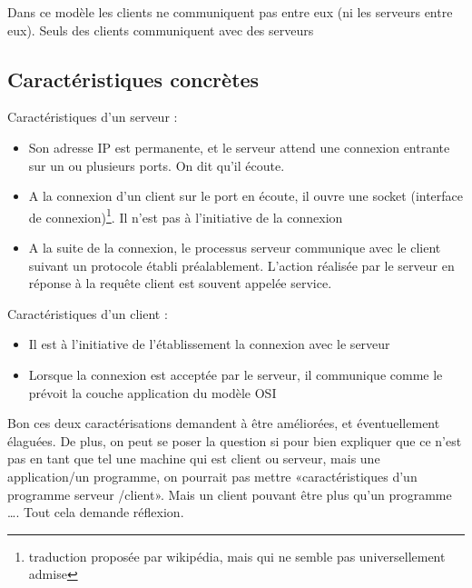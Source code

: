 \begin{rem}
	Dans ce modèle les clients ne communiquent pas entre eux (ni les serveurs entre eux). Seuls des clients communiquent avec des serveurs
\end{rem}

\subsection{Caractéristiques concrètes}

\begin{principe}
	Caractéristiques d'un serveur : \begin{itemize}[label=$\star$]
		\item Son adresse IP est permanente, et le serveur attend une connexion entrante sur un ou plusieurs ports. On dit qu'il écoute.
		\item A la connexion d'un client sur le port en écoute, il ouvre une socket (interface de connexion)\footnote{traduction proposée par wikipédia, mais qui ne semble pas universellement admise}. Il n'est pas à l'initiative de la connexion
		\item A la suite de la connexion, le processus serveur communique avec le client suivant un protocole établi préalablement. L'action réalisée par le serveur en réponse à la requête client est souvent appelée service.
	\end{itemize}
\end{principe}

\begin{principe}
	Caractéristiques d'un client : \begin{itemize}
		\item Il est à l'initiative de l'établissement la connexion avec le serveur
		\item Lorsque la connexion est acceptée par le serveur, il communique comme le prévoit la couche application du modèle OSI
	\end{itemize}
\end{principe}

\begin{com}
	Bon ces deux caractérisations demandent à être améliorées, et éventuellement élaguées. De plus, on peut se poser la question si pour bien expliquer que ce n'est pas en tant que tel une machine qui est client ou serveur, mais une application/un programme, on pourrait pas mettre «caractéristiques d'un programme serveur /client». Mais un client pouvant être plus qu'un programme \dots. Tout cela demande réflexion.
\end{com}

